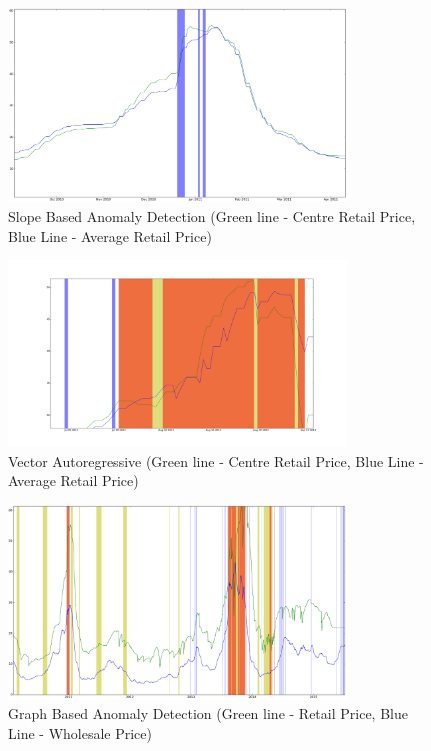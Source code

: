 \begin{figure}[H]
\centering
\includegraphics[width=0.8\textwidth]{graphs/12113.png}
\caption{Slope Based Anomaly Detection (Green line - Centre Retail Price, Blue Line - Average Retail Price)}
\label{fig:12113}
\end{figure}

\begin{figure}[H]
\centering
\includegraphics[width=0.8\textwidth]{graphs/20130719_0911.png}
\caption{Vector Autoregressive (Green line - Centre Retail Price, Blue Line - Average Retail Price)}
\label{fig:20130719_0911}
\end{figure}

\begin{figure}[H]
\centering
\includegraphics[width=0.8\textwidth]{graphs/12331.png}
\caption{Graph Based Anomaly Detection (Green line - Retail Price, Blue Line - Wholesale Price)}
\label{fig:12331}
\end{figure}



